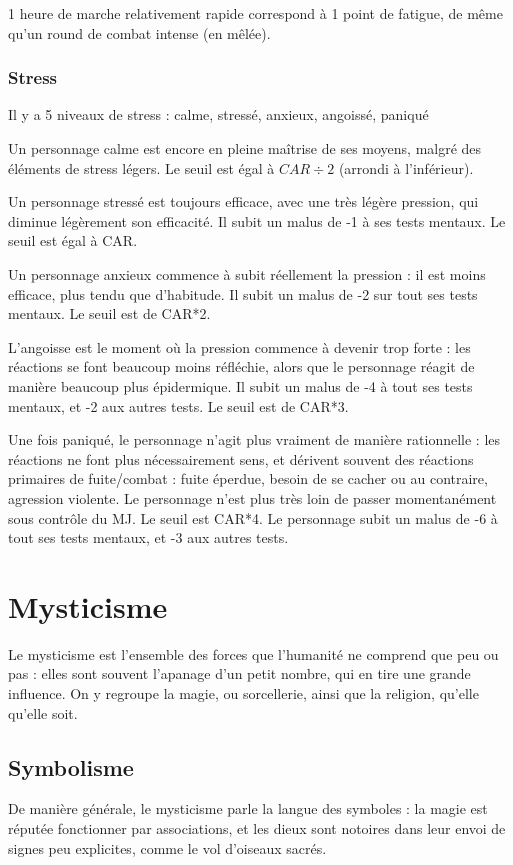 \documentclass[10pt,a4paper,twocolumn]{book}
\begin{document}
1 heure de marche relativement rapide correspond à 1 point de fatigue, de même qu'un round de combat intense (en mêlée).
\subsection{Stress}
Il y a 5 niveaux de stress : calme, stressé, anxieux, angoissé, paniqué

Un personnage calme est encore en pleine maîtrise de ses moyens, malgré des éléments de stress légers. Le seuil est égal à $CAR\div2$ (arrondi à l'inférieur).

Un personnage stressé est toujours efficace, avec une très légère pression, qui diminue légèrement son efficacité. Il subit un malus de -1 à ses tests mentaux. Le seuil est égal à CAR.

Un personnage anxieux commence à subit réellement la pression : il est moins efficace, plus tendu que d'habitude. Il subit un malus de -2 sur tout ses tests mentaux. Le seuil est de CAR*2.

L'angoisse est le moment où la pression commence à devenir trop forte : les réactions se font beaucoup moins réfléchie, alors que le personnage réagit de manière beaucoup plus épidermique. Il subit un malus de -4 à tout ses tests mentaux, et -2 aux autres tests. Le seuil est de CAR*3.

Une fois paniqué, le personnage n'agit plus vraiment de manière rationnelle : les réactions ne font plus nécessairement sens, et dérivent souvent des réactions primaires de fuite/combat : fuite éperdue, besoin de se cacher ou au contraire, agression violente. Le personnage n'est plus très loin de passer momentanément sous contrôle du MJ. Le seuil est CAR*4. Le personnage subit un malus de -6 à tout ses tests mentaux, et -3 aux autres tests.
\chapter{Mysticisme}
Le mysticisme est l'ensemble des forces que l'humanité ne comprend que peu ou pas : elles sont souvent l’apanage d'un petit nombre, qui en tire une grande influence. On y regroupe la magie, ou sorcellerie, ainsi que la religion, qu'elle qu'elle soit.

\section{Symbolisme}

De manière générale, le mysticisme parle la langue des symboles : la magie est réputée fonctionner par associations, et les dieux sont notoires dans leur envoi de signes peu explicites, comme le vol d'oiseaux sacrés.
\end{document}
